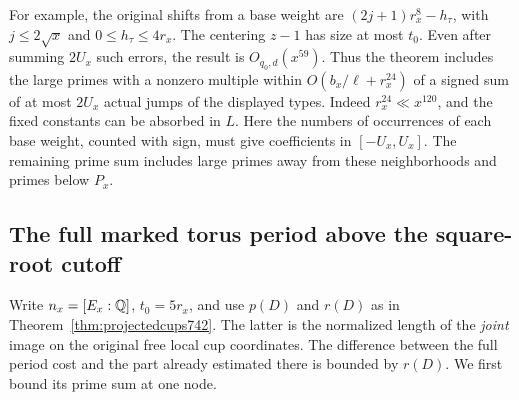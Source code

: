 \documentclass[a4paper,11pt]{article}
\theoremstyle{definition}
\theoremstyle{remark}
\numberwithin{equation}{section}
\begin{document}
For example, the original shifts from a base weight are
\((2j+1)r_x^8-h_\tau\), with \(j\le2\sqrt{x}\) and
\(0\le h_\tau\le4r_x\). The centering \(z-1\) has size
at most \(t_0\). Even after summing \(2U_x\) such errors,
the result is \(O_{q_0,d}(x^{59})\). Thus the theorem
includes the large primes with a nonzero multiple within
\(O(b_x/\ell+r_x^{24})\) of a signed sum of at most
\(2U_x\) actual jumps of the displayed types. Indeed
\(r_x^{24}\ll x^{120}\), and the fixed constants can be
absorbed in \(L\). Here the numbers of
occurrences of each base weight, counted with sign, must
give coefficients in \([-U_x,U_x]\). The remaining prime
sum includes large primes away from these neighborhoods
and primes below \(P_x\).
\clearpage

\subsection{The full marked torus period above the square-root cutoff}
\label{sec:fullperiodcutoff769}
Write \(n_x=[E_x:\mathbb Q]\), \(t_0=5r_x\), and use \(p(D)\) and
\(r(D)\) as in Theorem~\ref{thm:projectedcups742}. The latter
is the normalized length of the \emph{joint} image on the
original free local cup coordinates. The difference between
the full period cost and the part already estimated there is
bounded by \(r(D)\). We first bound its prime sum at one node.
\end{document}
